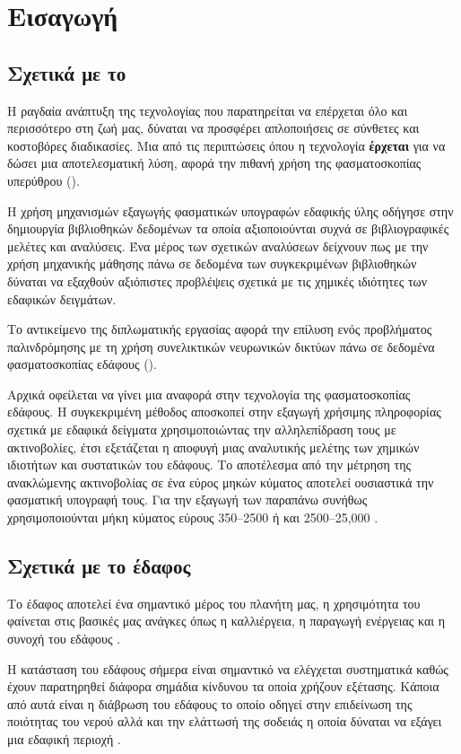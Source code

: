 \chapter{Εισαγωγή}
\label{ch:introduction}
\section{Σχετικά με το }
Η ραγδαία ανάπτυξη της τεχνολογίας που παρατηρείται να επέρχεται όλο και περισσότερο στη ζωή μας, δύναται να προσφέρει απλοποιήσεις σε σύνθετες και κοστοβόρες διαδικασίες. Μια από τις περιπτώσεις όπου η τεχνολογία \textbf{έρχεται} για να δώσει μια αποτελεσματική λύση, αφορά την πιθανή χρήση της φασματοσκοπίας υπερύθρου ().

Η χρήση μηχανισμών εξαγωγής φασματικών υπογραφών εδαφικής ύλης οδήγησε στην δημιουργία βιβλιοθηκών δεδομένων τα οποία αξιοποιούνται συχνά σε βιβλιογραφικές μελέτες και αναλύσεις. Ένα μέρος των σχετικών αναλύσεων δείχνουν πως με την χρήση μηχανικής μάθησης πάνω σε δεδομένα των συγκεκριμένων βιβλιοθηκών δύναται να εξαχθούν αξιόπιστες προβλέψεις σχετικά με τις χημικές ιδιότητες των εδαφικών δειγμάτων.

Το αντικείμενο της διπλωματικής εργασίας αφορά την επίλυση ενός προβλήματος παλινδρόμησης με τη χρήση συνελικτικών νευρωνικών δικτύων πάνω σε δεδομένα φασματοσκοπίας εδάφους ().

Αρχικά οφείλεται να γίνει μια αναφορά στην τεχνολογία της φασματοσκοπίας εδάφους. Η συγκεκριμένη μέθοδος αποσκοπεί στην εξαγωγή χρήσιμης πληροφορίας σχετικά με εδαφικά δείγματα χρησιμοποιώντας την αλληλεπίδραση τους με ακτινοβολίες, έτσι εξετάζεται η αποφυγή μιας αναλυτικής μελέτης των χημικών ιδιοτήτων και συστατικών του εδάφους. Το αποτέλεσμα από την μέτρηση της ανακλώμενης ακτινοβολίας σε ένα εύρος μηκών κύματος αποτελεί ουσιαστικά την φασματική υπογραφή τους. Για την εξαγωγή των παραπάνω συνήθως χρησιμοποιούνται μήκη κύματος εύρους 350–2500  ή και 2500–25,000 .

\section{Σχετικά με το έδαφος}
Το έδαφος αποτελεί ένα σημαντικό μέρος του πλανήτη μας, η χρησιμότητα του φαίνεται στις βασικές μας ανάγκες όπως η καλλιέργεια, η παραγωγή ενέργειας και η συνοχή του εδάφους \cite{vis_near_spectr}.

Η κατάσταση του εδάφους σήμερα είναι σημαντικό να ελέγχεται συστηματικά καθώς έχουν παρατηρηθεί διάφορα σημάδια κίνδυνου τα οποία χρήζουν εξέτασης. Κάποια από αυτά είναι η διάβρωση του εδάφους το οποίο οδηγεί στην επιδείνωση της ποιότητας του νερού αλλά και την ελάττωσή της σοδειάς η οποία δύναται να εξάγει μια εδαφική περιοχή \cite{world_soil_under_threat}.

